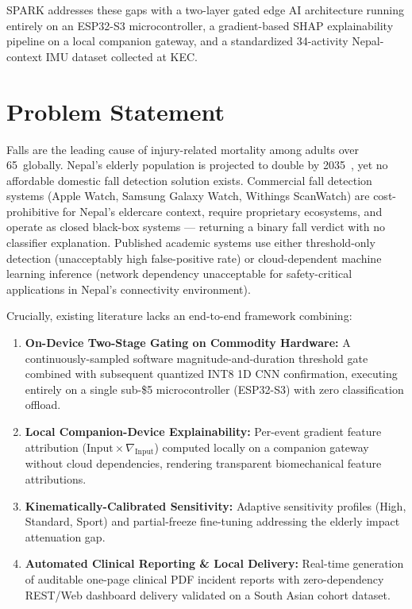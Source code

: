 SPARK addresses these gaps with a two-layer gated edge AI architecture running entirely on an ESP32-S3 microcontroller, a gradient-based SHAP explainability pipeline on a local companion gateway, and a standardized 34-activity Nepal-context IMU dataset collected at KEC.\@

\section{Problem Statement}

Falls are the leading cause of injury-related mortality among adults over 65~globally\cite{who2007falls}. Nepal's elderly population is projected to double by 2035~\cite{cbs2021nepal}, yet no affordable domestic fall detection solution exists. Commercial fall detection systems (Apple Watch, Samsung Galaxy Watch, Withings ScanWatch) are cost-prohibitive for Nepal's eldercare context, require proprietary ecosystems, and operate as closed black-box systems --- returning a binary fall verdict with no classifier explanation. Published academic systems use either threshold-only detection (unacceptably high false-positive rate) or cloud-dependent machine learning inference (network dependency unacceptable for safety-critical applications in Nepal's connectivity environment). 

Crucially, existing literature lacks an end-to-end framework combining:
\begin{enumerate}
\item \textbf{On-Device Two-Stage Gating on Commodity Hardware:} A continuously-sampled software magnitude-and-duration threshold gate combined with subsequent quantized INT8 1D CNN confirmation, executing entirely on a single sub-\$5 microcontroller (ESP32-S3) with zero classification offload.
\item \textbf{Local Companion-Device Explainability:} Per-event gradient feature attribution ($\text{Input} \times \nabla_{\text{Input}}$) computed locally on a companion gateway without cloud dependencies, rendering transparent biomechanical feature attributions.
\item \textbf{Kinematically-Calibrated Sensitivity:} Adaptive sensitivity profiles (High, Standard, Sport) and partial-freeze fine-tuning addressing the elderly impact attenuation gap.
\item \textbf{Automated Clinical Reporting \& Local Delivery:} Real-time generation of auditable one-page clinical PDF incident reports with zero-dependency REST/Web dashboard delivery validated on a South Asian cohort dataset.
\end{enumerate}

